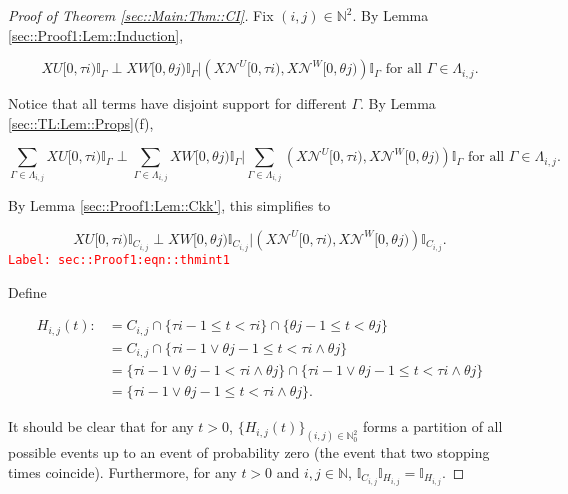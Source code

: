 \documentclass[12pt]{article}
\newcommand{\mb}{\mathbb}
\newcommand{\mc}{\mathcal}
\newcommand{\te}{\text}
\newcommand{\tr}{\textcolor{red}}
\newcommand{\labe}[1]{\tr{\texttt{Label: #1}}}
\renewcommand{\U}{U}							%
\newcommand{\UU}{W}								%
\renewcommand{\t}{t}							%
\newcommand{\X}{X}								%
\newcommand{\neigh}{\mc{N}}						%
\newcommand{\vind}[1]{^{#1}}					%
\newcommand{\rt}{\tau}							%
\newcommand{\rtt}{\theta}						%
\newcommand{\apath}{\Gamma}						%
\newcommand{\pathset}[2]{\Lambda_{#1,#2}}		%
\newcommand{\pathsete}[2]{C_{#1,#2}}			%
\newcommand{\pathseted}[2]{H_{#1,#2}}			%
\begin{document}
\begin{proof}[Proof of Theorem \ref{sec::Main:Thm::CI}]

Fix \((i,j) \in \mb{N}^2\). By Lemma \ref{sec::Proof1:Lem::Induction}, 

\[\X{\U}{[0,\rt{i})}\mb{I}_{\apath{}}\perp \X{\UU}{[0,\rtt{j})}\mb{I}_{\apath{}}\big|\left(\X{\neigh\vind{\U}}{[0,\rt{i})},\X{\neigh\vind{\UU}}{[0,\rtt{j})}\right)\mb{I}_{\apath{}}\te{ for all }\apath{} \in \pathset{i}{j}.\]

Notice that all terms have disjoint support for different \(\apath{}\). By Lemma \ref{sec::TL:Lem::Props}(f), 

\[\sum_{\apath{}\in\pathset{i}{j}}\X{\U}{[0,\rt{i})}\mb{I}_{\apath{}}\perp \sum_{\apath{}\in\pathset{i}{j}}\X{\UU}{[0,\rtt{j})}\mb{I}_{\apath{}}\bigg|\sum_{\apath{}\in\pathset{i}{j}}\left(\X{\neigh\vind{\U}}{[0,\rt{i})},\X{\neigh\vind{\UU}}{[0,\rtt{j})}\right)\mb{I}_{\apath{}}\te{ for all }\apath{} \in \pathset{i}{j}.\]

By Lemma \ref{sec::Proof1:Lem::Ckk'}, this simplifies to 

\begin{equation}
\X{\U}{[0,\rt{i})}\mb{I}_{\pathsete{i}{j}}\perp \X{\UU}{[0,\rtt{j})}\mb{I}_{\pathsete{i}{j}}\big|\left(\X{\neigh\vind{\U}}{[0,\rt{i})},\X{\neigh\vind{\UU}}{[0,\rtt{j})}\right)\mb{I}_{\pathsete{i}{j}}.
\label{sec::Proof1:eqn::thmint1}
\end{equation}
\labe{sec::Proof1:eqn::thmint1}

Define

\begin{align*}
\pathseted{i}{j}(\t) :&= \pathsete{i}{j}\cap \{\rt{i-1}\leq \t < \rt{i}\}\cap \{\rtt{j-1} \leq \t < \rtt{j}\}\\
&=\pathsete{i}{j}\cap\{\rt{i-1}\vee\rtt{j-1} \leq \t < \rt{i}\wedge \rtt{j}\}\\
&=\{\rt{i-1}\vee\rtt{j-1}  < \rt{i}\wedge \rtt{j}\} \cap \{\rt{i-1}\vee\rtt{j-1} \leq \t < \rt{i}\wedge \rtt{j}\}\\
&= \{\rt{i-1}\vee\rtt{j-1} \leq \t < \rt{i}\wedge \rtt{j}\}.
\end{align*}

It should be clear that for any \(\t > 0\), \(\{\pathseted{i}{j}(\t)\}_{(i,j)\in\mb{N}_0^2}\) forms a partition of all possible events up to an event of probability zero (the event that two stopping times coincide). Furthermore, for any \(\t > 0\) and \(i,j\in \mb{N}\), \(\mb{I}_{\pathsete{i}{j}}\mb{I}_{\pathseted{i}{j}} = \mb{I}_{\pathseted{i}{j}}\).


\end{proof}
\end{document}
